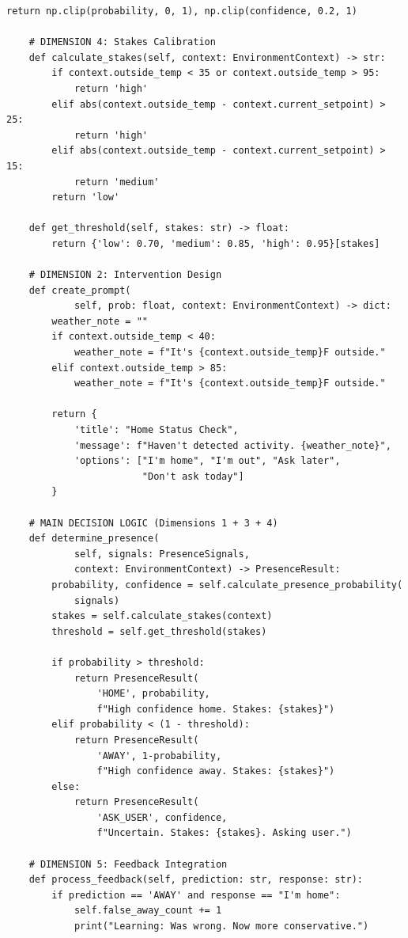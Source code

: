 \begin{lstlisting}[style=python, caption={Complete ImprovedNestController implementation}]
        return np.clip(probability, 0, 1), np.clip(confidence, 0.2, 1)

    # DIMENSION 4: Stakes Calibration
    def calculate_stakes(self, context: EnvironmentContext) -> str:
        if context.outside_temp < 35 or context.outside_temp > 95:
            return 'high'
        elif abs(context.outside_temp - context.current_setpoint) > 25:
            return 'high'
        elif abs(context.outside_temp - context.current_setpoint) > 15:
            return 'medium'
        return 'low'

    def get_threshold(self, stakes: str) -> float:
        return {'low': 0.70, 'medium': 0.85, 'high': 0.95}[stakes]

    # DIMENSION 2: Intervention Design
    def create_prompt(
            self, prob: float, context: EnvironmentContext) -> dict:
        weather_note = ""
        if context.outside_temp < 40:
            weather_note = f"It's {context.outside_temp}F outside."
        elif context.outside_temp > 85:
            weather_note = f"It's {context.outside_temp}F outside."

        return {
            'title': "Home Status Check",
            'message': f"Haven't detected activity. {weather_note}",
            'options': ["I'm home", "I'm out", "Ask later",
                        "Don't ask today"]
        }

    # MAIN DECISION LOGIC (Dimensions 1 + 3 + 4)
    def determine_presence(
            self, signals: PresenceSignals,
            context: EnvironmentContext) -> PresenceResult:
        probability, confidence = self.calculate_presence_probability(
            signals)
        stakes = self.calculate_stakes(context)
        threshold = self.get_threshold(stakes)

        if probability > threshold:
            return PresenceResult(
                'HOME', probability,
                f"High confidence home. Stakes: {stakes}")
        elif probability < (1 - threshold):
            return PresenceResult(
                'AWAY', 1-probability,
                f"High confidence away. Stakes: {stakes}")
        else:
            return PresenceResult(
                'ASK_USER', confidence,
                f"Uncertain. Stakes: {stakes}. Asking user.")

    # DIMENSION 5: Feedback Integration
    def process_feedback(self, prediction: str, response: str):
        if prediction == 'AWAY' and response == "I'm home":
            self.false_away_count += 1
            print("Learning: Was wrong. Now more conservative.")



\end{lstlisting}

